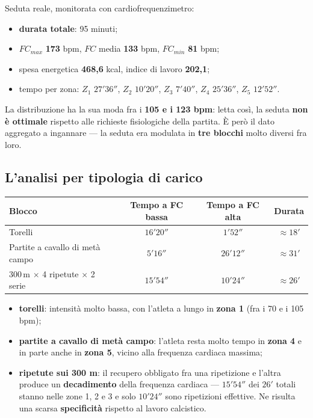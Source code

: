 Seduta reale, monitorata con cardiofrequenzimetro:

\begin{itemize}
  \item \textbf{durata totale}: 95 minuti;
  \item $FC_{max}$ \textbf{173} bpm, $FC$ media \textbf{133} bpm, $FC_{min}$ \textbf{81} bpm;
  \item spesa energetica \textbf{468,6} kcal, indice di lavoro \textbf{202,1};
  \item tempo per zona: $Z_1$ $27'36''$, $Z_2$ $10'20''$, $Z_3$ $7'40''$, $Z_4$ $25'36''$,
    $Z_5$ $12'52''$.
\end{itemize}

La distribuzione ha la sua moda fra i \textbf{105 e i 123 bpm}: letta così, la seduta
\textbf{non è ottimale} rispetto alle richieste fisiologiche della partita. È però il dato
aggregato a ingannare --- la seduta era modulata in \textbf{tre blocchi} molto diversi fra loro.

\subsection{L'analisi per tipologia di carico}

\begin{table}[htbp]
  \centering
  \small
  \renewcommand{\arraystretch}{1.3}
  \begin{tabularx}{\textwidth}{|X|c|c|c|}
    \hline
    \textbf{Blocco} & \textbf{Tempo a FC bassa} & \textbf{Tempo a FC alta} & \textbf{Durata} \\
    \hline
    Torelli & $16'20''$ & $1'52''$ & $\approx 18'$ \\
    \hline
    Partite a cavallo di metà campo & $5'16''$ & $26'12''$ & $\approx 31'$ \\
    \hline
    $300$\,m $\times$ 4 ripetute $\times$ 2 serie & $15'54''$ & $10'24''$ & $\approx 26'$ \\
    \hline
  \end{tabularx}
\end{table}

\begin{itemize}
  \item \textbf{torelli}: intensità molto bassa, con l'atleta a lungo in \textbf{zona 1} (fra i 70 e
    i 105 bpm);
  \item \textbf{partite a cavallo di metà campo}: l'atleta resta molto tempo in \textbf{zona 4} e in
    parte anche in \textbf{zona 5}, vicino alla frequenza cardiaca massima;
  \item \textbf{ripetute sui 300 m}: il recupero obbligato fra una ripetizione e l'altra produce un
    \textbf{decadimento} della frequenza cardiaca --- $15'54''$ dei $26'$ totali stanno nelle zone 1,
    2 e 3 e solo $10'24''$ sono ripetizioni effettive. Ne risulta una scarsa \textbf{specificità}
    rispetto al lavoro calcistico.
\end{itemize}

